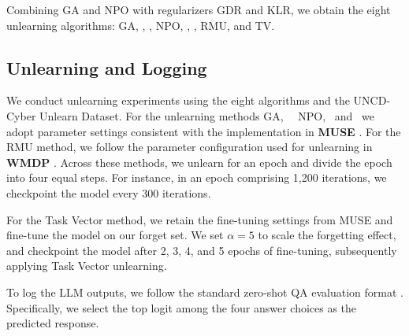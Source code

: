 \noindent Combining GA and NPO with regularizers GDR and KLR, we obtain the eight unlearning algorithms: GA, \GAGD, \GAKL, NPO, \NPOGD, \NPOKL, RMU, and TV.






\subsection{Unlearning and Logging}
\label{appendix: unlearning-logging}

We conduct unlearning experiments using the eight algorithms and the UNCD-Cyber Unlearn Dataset. For the unlearning methods GA, \GAGD\, \GAKL\, NPO, \NPOGD\, and \NPOKL\, we adopt parameter settings consistent with the implementation in \textbf{MUSE} \citep{shi2024muse}. For the RMU method, we follow the parameter configuration used for unlearning  \citep{tunstall2023zephyr} in \textbf{WMDP} \citep{li2024wmdp}. Across these methods, we unlearn for an epoch and divide the epoch into four equal steps. For instance, in an epoch comprising 1,200 iterations, we checkpoint the model every 300 iterations.

For the Task Vector method, we retain the fine-tuning settings from MUSE and fine-tune the model on our forget set. We set $\alpha=5$ to scale the forgetting effect, and checkpoint the model after 2, 3, 4, and 5 epochs of fine-tuning, subsequently applying Task Vector unlearning.

To log the LLM outputs, we follow the standard zero-shot QA evaluation format \citep{eval-harness}. Specifically, we select the top logit among the four answer choices as the predicted response.




